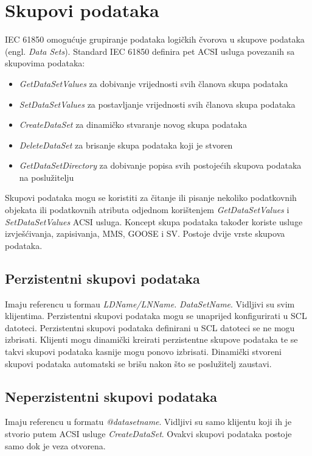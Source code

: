 \documentclass[times, utf8, zavrsni]{fer}
\begin{document}
\section{Skupovi podataka}
IEC 61850 omogućuje grupiranje podataka logičkih čvorova u skupove podataka (engl. \textit{Data Sets}). Standard IEC 61850 definira pet ACSI usluga povezanih sa skupovima podataka:
\begin{itemize}
    \item \textit{GetDataSetValues} za dobivanje vrijednosti svih članova skupa podataka
    \item \textit{SetDataSetValues} za postavljanje vrijednosti svih članova skupa podataka
    \item \textit{CreateDataSet} za dinamičko stvaranje novog skupa podataka
    \item \textit{DeleteDataSet} za brisanje skupa podataka koji je stvoren
    \item \textit{GetDataSetDirectory} za dobivanje popisa svih postojećih skupova podataka na poslužitelju
\end{itemize}

\bigskip
Skupovi podataka mogu se koristiti za čitanje ili pisanje nekoliko podatkovnih objekata ili podatkovnih atributa odjednom korištenjem \textit{GetDataSetValues} i \textit{SetDataSetValues} ACSI usluga. Koncept skupa podataka također koriste usluge izvješćivanja, zapisivanja, MMS, GOOSE i SV. Postoje dvije vrste skupova podataka.

\subsection{Perzistentni skupovi podataka}
Imaju referencu u formau \textit{LDName/LNName.} \textit{DataSetName}. Vidljivi su svim klijentima. Perzistentni skupovi podataka mogu se unaprijed konfigurirati u SCL datoteci. Perzistentni skupovi podataka definirani u SCL datoteci se ne mogu izbrisati. Klijenti mogu dinamički kreirati perzistentne skupove podataka te se takvi skupovi podataka kasnije mogu ponovo izbrisati. Dinamički stvoreni skupovi podataka automatski se brišu nakon što se poslužitelj zaustavi.

\subsection{Neperzistentni skupovi podataka}
Imaju referencu u formatu \textit{@datasetname}. Vidljivi su samo klijentu koji ih je stvorio putem ACSI usluge \textit{CreateDataSet}. Ovakvi skupovi podataka postoje samo dok je veza otvorena.
\end{document}
